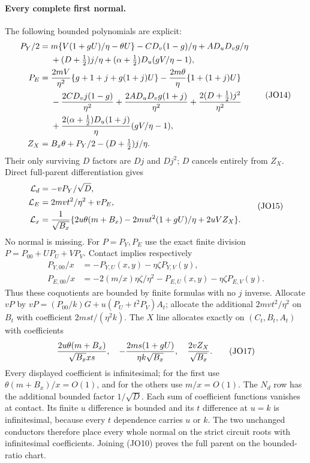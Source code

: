 \paragraph{Every complete first normal.}
The following bounded polynomials are explicit:
\[
 \begin{aligned}
 P_Y/2={}&m\{V(1+gU)/\eta-\theta U\}
       -C D_v(1-g)/\eta+A D_uD_vg/\eta\\
       &+(D+\tfrac12)j/\eta+
                  (\alpha+\tfrac12)D_u(gV/\eta-1),\\
 P_E={}&{2mV\over\eta^2}\{g+1+j+g(1+j)U\}
       -{2m\theta\over\eta}\{1+(1+j)U\}\\
       &-{2CD_vj(1-g)\over\eta^2}
        +{2AD_uD_vg(1+j)\over\eta^2}
        +{2(D+\tfrac12)j^2\over\eta^2}\\
       &+{2(\alpha+\tfrac12)D_u(1+j)\over\eta}
                                      (gV/\eta-1),\\
 Z_X={}&B_x\theta+P_Y/2-(D+\tfrac12)j/\eta .
 \end{aligned}                                                \tag{JO14}
\]
Their only surviving $D$ factors are $Dj$ and $Dj^2$; $D$
cancels entirely from $Z_X$. Direct full-parent differentiation gives
\[
 \begin{aligned}
 \mathcal L_d&=-vP_Y/\sqrt D,\\
 \mathcal L_E&=2mvt^2/\eta^2+vP_E,\\
 \mathcal L_x&={1\over\sqrt{B_x}}
 \{2u\theta(m+B_x)-2mut^2(1+gU)/\eta+2uVZ_X\}.
 \end{aligned}                                                \tag{JO15}
\]
No normal is missing. For $P=P_Y,P_E$ use the exact finite
division $P=P_{00}+UP_U+VP_V$. Contact implies respectively
\[
 \begin{aligned}
 P_{Y,00}/x&=-P_{Y,U}(x,y)-\eta\zeta P_{Y,V}(y),\\
 P_{E,00}/x&=-2(m/x)\eta\zeta/\eta^2
                  -P_{E,U}(x,y)-\eta\zeta P_{E,V}(y).
 \end{aligned}                                                \tag{JO16}
\]
Thus these coquotients are bounded by finite formulas with no $j$
inverse. Allocate $vP$ by
$vP=(P_{00}/k)G+u(P_U+t^2P_V)A_t$; allocate the additional
$2mvt^2/\eta^2$ on $B_t$ with coefficient
$2mst/(\eta^2k)$. The $X$ line allocates exactly on $(C_t,B_t,A_t)$
with coefficients
\[
 {2u\theta(m+B_x)\over\sqrt{B_x}xs},\quad
 -{2ms(1+gU)\over\eta k\sqrt{B_x}},\quad
 {2vZ_X\over\sqrt{B_x}}.                               \tag{JO17}
\]
Every displayed coefficient is infinitesimal; for the first use
$\theta(m+B_x)/x=O(1)$, and for the others use $m/x=O(1)$.
The $N_d$ row has the additional bounded factor $1/\sqrt D$.
Each sum of coefficient functions vanishes at contact. Its finite
$u$ difference is bounded and its $t$ difference at $u=k$ is
infinitesimal, because every $t$ dependence carries $u$ or $k$.
The two unchanged conductors therefore place every whole normal on the
strict circuit roots with infinitesimal coefficients. Joining (JO10)
proves the full parent on the bounded-ratio chart.

